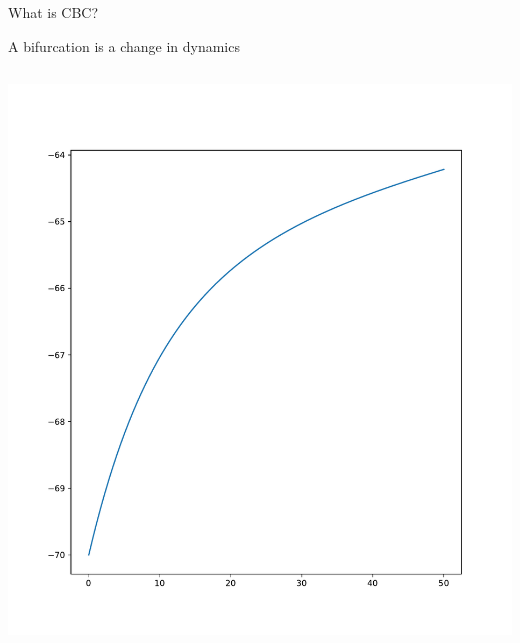 \documentclass[presentation]{beamer}
\begin{document}
\begin{frame}[label={sec:org273aa8e}]{What is CBC?}
\begin{center}
A bifurcation is a change in dynamics
\end{center}
\begin{columns}
\begin{column}{0.5\columnwidth}
\begin{center}
\includegraphics[height=.8\textheight]{./excitable.pdf}
\end{center}
\end{column}


\end{columns}
\end{frame}
\end{document}
